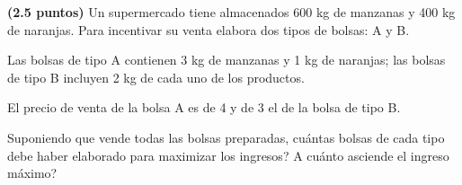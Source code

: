 
\textbf{(2.5 puntos)} Un supermercado tiene almacenados 600 kg de manzanas y 400 kg de naranjas. Para incentivar su venta elabora dos tipos de bolsas: A y B.

Las bolsas de tipo A contienen 3 kg de manzanas y 1 kg de naranjas; las bolsas de tipo B incluyen 2 kg de cada uno de los productos.

El precio de venta de la bolsa A es de 4 \texteuro{} y de 3 \texteuro{} el de la bolsa de tipo B.

Suponiendo que vende todas las bolsas preparadas, \textquestiondown{}cuántas bolsas de cada tipo debe haber elaborado para maximizar los ingresos? \textquestiondown{}A cuánto asciende el ingreso máximo?
